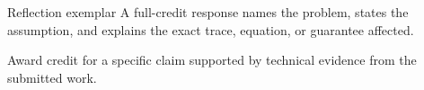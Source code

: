 \documentclass[aspectratio=169,11pt]{beamer}
\begin{document}
\begin{frame}{Reflection exemplar}
\small
\answerlabel A full-credit response names the problem, states the assumption, and explains the exact trace, equation, or guarantee affected.

\vspace{0.25cm}
\gradinglabel Award credit for a specific claim supported by technical evidence from the submitted work.
\end{frame}
\end{document}
